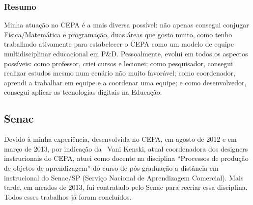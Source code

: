 \subsubsection{Resumo}

Minha atuação no CEPA é a mais diversa possível: não apenas consegui conjugar Física/Matemática e programação, duas áreas que gosto muito, como tenho trabalhado ativamente para estabelecer o CEPA como um modelo de equipe multidisciplinar educacional em P\&D. Pessoalmente, evoluí em todos os aspectos possíveis: como professor, criei cursos e lecionei; como pesquisador, consegui realizar estudos mesmo num cenário não muito favorável; como coordenador, aprendi a trabalhar em equipe e a coordenar uma equipe; e como desenvolvedor, consegui aplicar as tecnologias digitais na Educação.

\subsection{Senac}

Devido à minha experiência, desenvolvida no CEPA, em agosto de 2012 e em março de 2013, por indicação da \profa\ Vani Kenski, atual coordenadora dos designers instrucionais do CEPA, atuei como docente na disciplina ``Processos de produção de objetos de aprendizagem'' do curso de pós-graduação a distância em  instrucional do Senac/SP (Serviço Nacional de Aprendizagem Comercial). Mais tarde, em meados de 2013, fui contratado pelo Senac para recriar essa disciplina. Todos esses trabalhos já foram concluídos.
